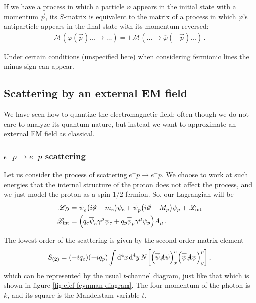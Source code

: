 \documentclass[main.tex]{subfiles}
\begin{document}
\begin{claim}
If we have a process in which a particle \(\varphi \) appears in the initial state with a momentum \(\vec{p}\), its \(S\)-matrix is equivalent to the matrix of a process in which \(\varphi \)'s antiparticle appears in the final state with its momentum reversed: 
%
\begin{align}
\mathcal{M} (\varphi (\vec{p}) \dots \to \dots)
= \pm \mathcal{M} (\dots \to \overline{\varphi}(-\vec{p}) \dots)
\,.
\end{align}
\end{claim}

Under certain conditions (unspecified here) when considering fermionic lines the minus sign can appear. 


\subsection{Scattering by an external EM field}

We have seen how to quantize the electromagnetic field; often though we do not care to analyze its quantum nature, but instead we want to approximate an external EM field as classical. 

\subsubsection{\(e^{-} p \to e^{-} p\) scattering}

Let us consider the process of scattering \(e^{-} p \to e^{-} p\). We choose to work at such energies that the internal structure of the proton does not affect the process, and we just model the proton as a spin \(1/2\) fermion. So, our Lagrangian will be 
%
\begin{align}
\mathscr{L}_{D} &= 
\overline{\psi}_{e} \qty(i \slashed{\partial} -m_e ) \psi_{e} +
\overline{\psi}_{p} \qty(i \slashed{\partial} -M_p ) \psi_{p} +
\mathscr{L} _{\text{int}} \\
\mathscr{L} _{\text{int}} &= \qty(q_e \overline{\psi}_{e} \gamma^{\mu } \psi_{e} + q_p \overline{\psi}_{p} \gamma^{\mu }\psi_{p}) A_{\mu }
\,.
\end{align}

The lowest order of the scattering is given by the second-order matrix element 
%
\begin{align}
S_{(2)} = (-i q_e)(-i q_p) \int \dd[4]{x} \dd[4]{y}
N \qty[ \qty(\overline{\psi} \slashed{A} \psi )_{x}^{e} \qty(\overline{\psi} \slashed{A} \psi )_{y}^{p}]
\,,
\end{align}
%
which can be represented by the usual \(t\)-channel diagram, just like that which is shown in figure \ref{fig:efef-feynman-diagram}. 
The four-momentum of the photon is \(k\), and its square is the Mandelstam variable \(t\). 
\end{document}
